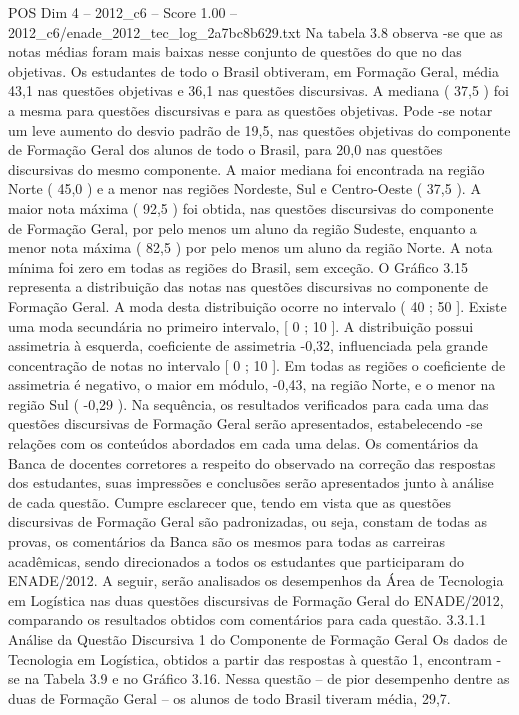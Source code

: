\begin{textsample}{POS Dim 4 – 2012\_c6 – Score 1.00 – 2012\_c6/enade\_2012\_tec\_log\_2a7bc8b629.txt}
Na tabela 3.8 observa -se que as notas médias foram mais baixas nesse conjunto de questões do que no das objetivas.
Os estudantes de todo o Brasil obtiveram, em Formação Geral, média 43,1 nas questões objetivas e 36,1 nas questões discursivas.
A mediana ( 37,5 ) foi a mesma para questões discursivas e para as questões objetivas.
Pode -se notar um leve aumento do desvio padrão de 19,5, nas questões objetivas do componente de Formação Geral dos alunos de todo o Brasil, para 20,0 nas questões discursivas do mesmo componente.
A maior mediana foi encontrada na região Norte ( 45,0 ) e a menor nas regiões Nordeste, Sul e Centro-Oeste ( 37,5 ).
A maior nota máxima ( 92,5 ) foi obtida, nas questões discursivas do componente de Formação Geral, por pelo menos um aluno da região Sudeste, enquanto a menor nota máxima ( 82,5 ) por pelo menos um aluno da região Norte.
A nota mínima foi zero em todas as regiões do Brasil, sem exceção.
O Gráfico 3.15 representa a distribuição das notas nas questões discursivas no componente de Formação Geral.
A moda desta distribuição ocorre no intervalo ( 40 ; 50 ].
Existe uma moda secundária no primeiro intervalo, [ 0 ; 10 ].
A distribuição possui assimetria à esquerda, coeficiente de assimetria -0,32, influenciada pela grande concentração de notas no intervalo [ 0 ; 10 ].
Em todas as regiões o coeficiente de assimetria é negativo, o maior em módulo, -0,43, na região Norte, e o menor na região Sul ( -0,29 ).
Na sequência, os resultados verificados para cada uma das questões discursivas de Formação Geral serão apresentados, estabelecendo -se relações com os conteúdos abordados em cada uma delas.
Os comentários da Banca de docentes corretores a respeito do observado na correção das respostas dos estudantes, suas impressões e conclusões serão apresentados junto à análise de cada questão.
Cumpre esclarecer que, tendo em vista que as questões discursivas de Formação Geral são padronizadas, ou seja, constam de todas as provas, os comentários da Banca são os mesmos para todas as carreiras acadêmicas, sendo direcionados a todos os estudantes que participaram do ENADE/2012.
A seguir, serão analisados os desempenhos da Área de Tecnologia em Logística nas duas questões discursivas de Formação Geral do ENADE/2012, comparando os resultados obtidos com comentários para cada questão. 3.3.1.1 Análise da Questão Discursiva 1 do Componente de Formação Geral Os dados de Tecnologia em Logística, obtidos a partir das respostas à questão 1, encontram -se na Tabela 3.9 e no Gráfico 3.16.
Nessa questão – de pior desempenho dentre as duas de Formação Geral – os alunos de todo Brasil tiveram média, 29,7.

\end{textsample}
